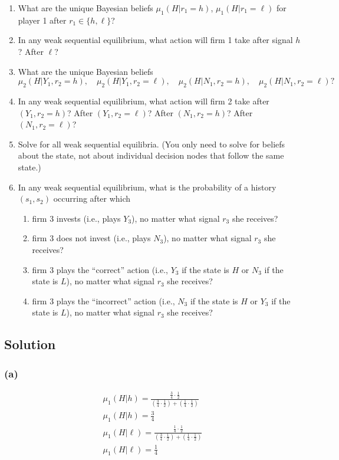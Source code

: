 \documentclass[10pt, a4paper]{article}
\begin{document}
      \begin{enumerate}
          \item What are the unique Bayesian beliefs $\mu_1(H|r_1 = h)$, $\mu_1(H|r_1 = \ell)$ for player 1 after $r_1 \in \{h, \ell\}$?
          \item In any weak sequential equilibrium, what action will firm 1 take after signal $h$? After $\ell$?
          \item What are the unique Bayesian beliefs
          \[
          \mu_2(H|Y_1, r_2 = h), \quad \mu_2(H|Y_1, r_2 = \ell), \quad \mu_2(H|N_1, r_2 = h), \quad \mu_2(H|N_1, r_2 = \ell)?
          \]
          \item In any weak sequential equilibrium, what action will firm 2 take after $(Y_1, r_2 = h)$? After $(Y_1, r_2 = \ell)$? After $(N_1, r_2 = h)$? After $(N_1, r_2 = \ell)$?
          \item Solve for all weak sequential equilibria. (You only need to solve for beliefs about the state, not about individual decision nodes that follow the same state.)
          \item In any weak sequential equilibrium, what is the probability of a history $(s_1, s_2)$ occurring after which
          \begin{enumerate}
              \item firm 3 invests (i.e., plays $Y_3$), no matter what signal $r_3$ she receives?
              \item firm 3 does not invest (i.e., plays $N_3$), no matter what signal $r_3$ she receives?
              \item firm 3 plays the “correct” action (i.e., $Y_3$ if the state is $H$ or $N_3$ if the state is $L$), no matter what signal $r_3$ she receives?
              \item firm 3 plays the “incorrect” action (i.e., $N_3$ if the state is $H$ or $Y_3$ if the state is $L$), no matter what signal $r_3$ she receives?
          \end{enumerate}
      \end{enumerate}
    \subsection*{Solution}
      \subsubsection*{(a)}
        \begin{gather*}
          \mu_1(H|h) = \frac{\frac{3}{4}\cdot\frac{1}{2}}{(\frac{3}{4}\cdot\frac{1}{2})+(\frac{1}{4}\cdot\frac{1}{2})} \\
          \mu_1(H|h) = \frac{3}{4}\\
          \mu_1(H|\ell) = \frac{\frac{1}{4}\cdot\frac{1}{2}}{(\frac{3}{4}\cdot\frac{1}{2})+(\frac{1}{4}\cdot\frac{1}{2})} \\
          \mu_1(H|\ell) = \frac{1}{4}
        \end{gather*}
\end{document}
